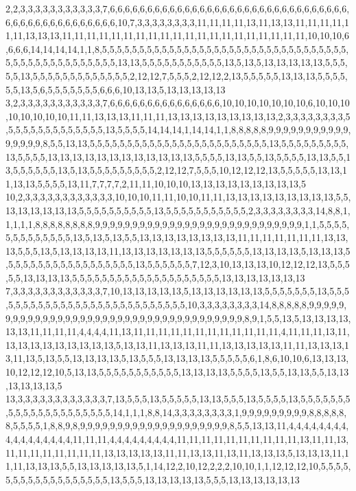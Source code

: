 2,2,3,3,3,3,3,3,3,3,3,3,3,7,6,6,6,6,6,6,6,6,6,6,6,6,6,6,6,6,6,6,6,6,6,6,6,6,6,6,6,6,6,6,6,6,6,6,6,6,6,6,6,6,6,6,6,6,6,6,6,10,7,3,3,3,3,3,3,3,3,11,11,11,11,13,11,13,13,11,11,11,11,11,11,13,13,13,11,11,11,11,11,11,11,11,11,11,11,11,11,11,11,11,11,11,11,11,10,10,10,6,6,6,6,14,14,14,14,1,1,8,5,5,5,5,5,5,5,5,5,5,5,5,5,5,5,5,5,5,5,5,5,5,5,5,5,5,5,5,5,5,5,5,5,5,5,5,5,5,5,5,5,5,5,5,5,5,5,5,13,13,5,5,5,5,5,5,5,5,5,5,5,13,5,13,5,13,13,13,13,13,5,5,5,5,5,13,5,5,5,5,5,5,5,5,5,5,5,5,5,2,12,12,7,5,5,5,2,12,12,2,13,5,5,5,5,5,13,13,13,5,5,5,5,5,5,13,5,6,5,5,5,5,5,5,5,6,6,6,10,13,13,5,13,13,13,13,13
3,2,3,3,3,3,3,3,3,3,3,3,3,7,6,6,6,6,6,6,6,6,6,6,6,6,6,6,6,10,10,10,10,10,10,10,6,10,10,10,10,10,10,10,10,11,11,13,13,13,11,11,11,13,13,13,13,13,13,13,13,13,2,3,3,3,3,3,3,3,3,5,5,5,5,5,5,5,5,5,5,5,5,5,5,13,5,5,5,5,14,14,14,1,14,14,1,1,8,8,8,8,8,9,9,9,9,9,9,9,9,9,9,9,9,9,9,9,9,8,5,5,13,13,5,5,5,5,5,5,5,5,5,5,5,5,5,5,5,5,5,5,5,5,5,5,5,5,13,5,5,5,5,5,5,5,5,5,13,5,5,5,5,13,13,13,13,13,13,13,13,13,13,13,13,5,5,5,5,13,13,5,5,13,5,5,5,5,13,13,5,5,13,5,5,5,5,5,5,13,5,13,5,5,5,5,5,5,5,5,5,2,12,12,7,5,5,5,10,12,12,12,13,5,5,5,5,5,13,13,11,13,13,5,5,5,5,13,11,7,7,7,7,2,11,11,10,10,10,13,13,13,13,13,13,13,13,13,5
10,2,3,3,3,3,3,3,3,3,3,3,3,3,10,10,10,11,11,10,10,11,11,13,13,13,13,13,13,13,13,13,5,5,13,13,13,13,13,13,5,5,5,5,5,5,5,5,5,5,13,5,5,5,5,5,5,5,5,5,5,5,2,3,3,3,3,3,3,3,3,14,8,8,1,1,1,1,1,8,8,8,8,8,8,8,8,9,9,9,9,9,9,9,9,9,9,9,9,9,9,9,9,9,9,9,9,9,9,9,9,9,9,9,9,1,1,5,5,5,5,5,5,5,5,5,5,5,5,5,13,5,13,5,13,5,5,13,13,13,13,13,13,13,13,11,11,11,11,11,11,11,13,13,13,5,5,5,13,5,13,13,13,13,11,13,13,13,13,13,13,13,5,5,5,5,5,5,13,13,13,13,5,13,13,13,5,5,5,5,5,5,5,5,5,5,5,5,5,5,5,5,5,5,13,5,5,5,5,5,5,7,12,3,10,13,13,13,10,12,12,12,13,5,5,5,5,5,13,13,13,13,5,5,5,5,5,5,5,5,5,5,5,5,5,5,5,5,5,5,5,5,13,13,13,13,13,13,13
7,3,3,3,3,3,3,3,3,3,3,3,3,7,10,13,13,13,13,13,5,13,13,13,13,13,13,5,5,5,5,5,5,5,13,5,5,5,5,5,5,5,5,5,5,5,5,5,5,5,5,5,5,5,5,5,5,5,5,5,5,5,10,3,3,3,3,3,3,3,3,14,8,8,8,8,8,9,9,9,9,9,9,9,9,9,9,9,9,9,9,9,9,9,9,9,9,9,9,9,9,9,9,9,9,9,9,9,9,9,9,9,9,9,8,9,1,5,5,13,5,13,13,13,13,13,13,11,11,11,11,4,4,4,4,11,13,11,11,11,11,11,11,11,11,11,11,11,11,4,11,11,11,13,11,13,13,13,13,13,13,13,13,13,5,13,13,11,13,13,13,11,11,13,13,13,13,13,11,11,13,13,13,13,11,13,5,13,5,5,13,13,13,13,5,13,5,5,5,13,13,13,13,5,5,5,5,5,6,1,8,6,10,10,6,13,13,13,10,12,12,12,10,5,13,13,5,5,5,5,5,5,5,5,5,5,5,13,13,13,13,5,5,5,5,13,5,5,13,13,5,5,13,13,13,13,13,13,5
13,3,3,3,3,3,3,3,3,3,3,3,3,7,13,5,5,5,13,5,5,5,5,5,13,13,5,5,5,13,5,5,5,5,13,5,5,5,5,5,5,5,5,5,5,5,5,5,5,5,5,5,5,5,5,5,14,1,1,1,8,8,14,3,3,3,3,3,3,3,3,1,9,9,9,9,9,9,9,9,9,8,8,8,8,8,8,5,5,5,5,1,8,8,9,8,9,9,9,9,9,9,9,9,9,9,9,9,9,9,9,9,9,9,9,9,8,5,5,13,13,11,4,4,4,4,4,4,4,4,4,4,4,4,4,4,4,4,4,11,11,11,4,4,4,4,4,4,4,4,4,11,11,11,11,11,11,11,11,11,11,13,11,11,13,11,11,11,11,11,11,11,11,13,13,13,13,13,11,11,13,13,11,13,11,13,13,13,5,13,13,13,11,11,11,13,13,13,5,5,13,13,13,13,13,5,1,14,12,2,10,12,2,2,2,10,10,1,1,12,12,12,10,5,5,5,5,5,5,5,5,5,5,5,5,5,5,5,5,5,5,13,5,5,5,13,13,13,13,13,5,5,5,13,13,13,13,13,13
